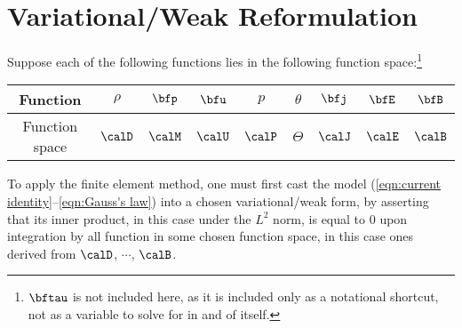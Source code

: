 \section{Variational/Weak Reformulation}

    Suppose each of the following functions lies in the following function space:\footnote{$\bftau$ is not included here, as it is included only as a notational shortcut, not as a variable to solve for in and of itself.} 
    \begin{center}\begin{tabular}{ c || c : c c : c c | c | c c }
        Function  &  $\rho$  &  $\bfp$  &  $\bfu$  &  $p$  &  $\theta$ 
         &  $\bfj$  &  $\bfE$  &  $\bfB$  \\
        \hline
        Function space  &  $\calD$  &  $\calM$  &  $\calU$  &  $\calP$  &  $\Theta$  &  $\calJ$  &  $\calE$  &  $\calB$  \\
    \end{tabular}\end{center}
    
    To apply the finite element method, one must first cast the model (\ref{eqn:current identity}--\ref{eqn:Gauss's law}) into a chosen variational/weak form, by asserting that its inner product, in this case under the $L^{2}$ norm, is equal to $0$ upon integration by all function in some chosen function space, in this case ones derived from $\calD$, $\cdots$, $\calB$.


    
    
    
